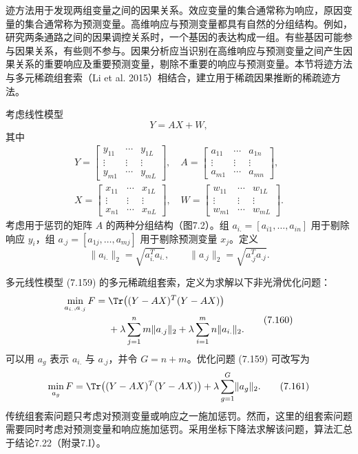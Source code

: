 迹方法用于发现两组变量之间的因果关系。效应变量的集合通常称为响应，原因变量的集合通常称为预测变量。高维响应与预测变量都具有自然的分组结构。例如，研究两条通路之间的因果调控关系时，一个基因的表达构成一组。有些基因可能参与因果关系，有些则不参与。因果分析应当识别在高维响应与预测变量之间产生因果关系的重要响应及重要预测变量，剔除不重要的响应与预测变量。本节将迹方法与多元稀疏组套索（Li et al. 2015）相结合，建立用于稀疏因果推断的稀疏迹方法。

考虑线性模型
\begin{equation}
Y=AX+W,
\tag{7.159}
\end{equation}
其中
\[
\begin{gathered}
Y=\begin{bmatrix}y_{11}&\cdots&y_{1L}\\\vdots&\vdots&\vdots\\y_{m1}&\cdots&y_{mL}\end{bmatrix},\quad
A=\begin{bmatrix}a_{11}&\cdots&a_{1n}\\\vdots&\vdots&\vdots\\a_{m1}&\cdots&a_{mn}\end{bmatrix},\\
X=\begin{bmatrix}x_{11}&\cdots&x_{1L}\\\vdots&\vdots&\vdots\\x_{n1}&\cdots&x_{nL}\end{bmatrix},\quad
W=\begin{bmatrix}w_{11}&\cdots&w_{1L}\\\vdots&\vdots&\vdots\\w_{m1}&\cdots&w_{mL}\end{bmatrix}.
\end{gathered}
\]
考虑用于惩罚的矩阵 $A$ 的两种分组结构（图7.2）。组 $a_{i.}=[a_{i1},\ldots,a_{in}]$ 用于剔除响应 $y_i$，组 $a_{.j}=[a_{1j},\ldots,a_{mj}]$ 用于剔除预测变量 $x_j$。定义
\[
\lVert a_{i.}\rVert_2=\sqrt{a_{i.}^Ta_{i.}},\qquad
\lVert a_{.j}\rVert_2=\sqrt{a_{.j}^Ta_{.j}}.
\]

多元线性模型 (7.159) 的多元稀疏组套索，定义为求解以下非光滑优化问题：
\begin{equation}
\begin{aligned}
\min_{a_{i.},a_{.j}}F={}&\Tr\bigl((Y-AX)^T(Y-AX)\bigr)\\
&+\lambda\sum_{j=1}^nm\lVert a_{.j}\rVert_2
+\lambda\sum_{i=1}^mn\lVert a_{i.}\rVert_2.
\end{aligned}
\tag{7.160}
\end{equation}
可以用 $a_g$ 表示 $a_{i.}$ 与 $a_{.j}$，并令 $G=n+m$。优化问题 (7.159) 可改写为
\begin{equation}
\min_{a_g}F=\Tr\bigl((Y-AX)^T(Y-AX)\bigr)+\lambda\sum_{g=1}^G\lVert a_g\rVert_2.
\tag{7.161}
\end{equation}
传统组套索问题只考虑对预测变量或响应之一施加惩罚。然而，这里的组套索问题需要同时考虑对预测变量和响应施加惩罚。采用坐标下降法求解该问题，算法汇总于结论7.22（附录7.I）。

